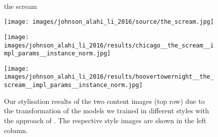 \begin{figure}[H]
\begin{minipage}[t]{0.3\textwidth}
	\end{minipage}
	\hfill \\ the scream \hfill \\
	\begin{minipage}[t]{0.3\textwidth}
		\centering
		\texttt{[image: images/johnson\_alahi\_li\_2016/source/the\_scream.jpg]}
	\end{minipage}
	\hfill%
	\begin{minipage}[t]{0.3\textwidth}
		\centering
		\texttt{[image: images/johnson\_alahi\_li\_2016/results/chicago\_\_the\_scream\_\_impl\_params\_\_instance\_norm.jpg]}
	\end{minipage}
	\hfill%
	\begin{minipage}[t]{0.3\textwidth}
		\centering
		\texttt{[image: images/johnson\_alahi\_li\_2016/results/hoovertowernight\_\_the\_scream\_\_impl\_params\_\_instance\_norm.jpg]}
	\end{minipage}
	\label{fig:johnson_alahi_li_2016_fig_appendix}
	\caption{Our stylisation results of the two content images (top row) due to the transformation of the models we trained in different styles with the approach of \cite{JAL2016}. The respective style images are shown in the left column.}
\end{figure}

